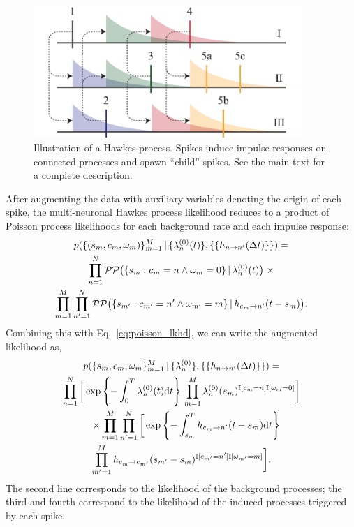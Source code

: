 \begin{figure}[t]
\centering%
\includegraphics[width=4in]{figures/ch3/Hawkes-wide} 
\vspace{-0.25cm}
\caption[Illustration of a Hawkes process]{Illustration of a Hawkes
  process. Spikes induce impulse responses on connected processes and
  spawn ``child'' spikes. See the main text for a complete
  description.}
\label{fig:hawkes}
\end{figure}

After augmenting the data with auxiliary variables denoting the origin
of each spike, the multi-neuronal Hawkes process likelihood reduces to 
a product of Poisson process likelihoods for each background rate and 
each impulse response:
\begin{multline*}
  p(\{(s_m,c_m,\omega_m)\}_{m=1}^M \,|\, 
  \{\lambda^{(0)}_{n}(t)\}, \{\{h_{n \to n'}(\Delta t)\}\}) = \\
  \prod_{n=1}^N \mathcal{PP} \big(\{s_{m}: c_{m}=n \wedge \omega_{m}=0\} \,|\, \lambda^{(0)}_{n}(t) \big) \; \times\\
  \prod_{m=1}^M \prod_{n'=1}^N \mathcal{PP} \big(\{s_{m'}: c_{m'}=n' \wedge \omega_{m'}=m\} \,|\, h_{c_m \to n'}(t-s_m) \big).
\end{multline*}
Combining this with 
Eq.~\ref{eq:poisson_lkhd}, we can
write the augmented likelihood as,
\begin{multline}
  \label{eq:hawkes_likelihood}
  p(\{s_m, c_m, \omega_m\}_{m=1}^M \,|\, \{\lambda^{(0)}_{n}\}, \{\{h_{n \to n'}(\Delta t)\}\}) = \\
  \prod^N_{n=1} \bigg[
  \exp\left\{ -\int_0^T \lambda^{(0)}_{n}(t)\mathrm{d}t \right\} \,
  \prod^M_{m=1}
   \lambda^{(0)}_{n}(s_m)^{\mathbb{I}[c_m=n] \mathbb{I}[\omega_m = 0]} \bigg]\\
  \quad\times \prod_{m=1}^M \prod_{n'=1}^N \bigg[
  \exp\left\{-\int^T_{s_m} h_{c_m \to n'}(t - s_m) \mathrm{d}t \right\} \\
  \prod_{m'=1}^M h_{c_m^{~} \to c_{m'}}(s_{m'}-s_m)^{\mathbb{I}[c_{m'}=n'] \mathbb{I}[\omega_{m'}=m]}\bigg].
\end{multline}
The second line corresponds to the likelihood of the background
processes; the third and fourth correspond to the likelihood of the
induced processes triggered by each spike.

